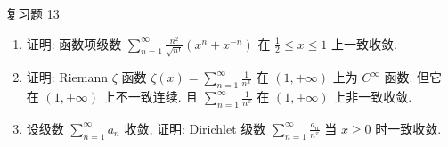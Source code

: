 \begin{exblock}{复习题 13}
\begin{enumerate}
  \item 证明: 函数项级数 $\sum_{n=1}^{\infty}\frac{n^{2}}{\sqrt{n!}}(x^{n}+x^{-n})$ 在 $\frac{1}{2}\leqslant x\leqslant1$ 上一致收敛.
  \item 证明: Riemann $\zeta$ 函数 $\zeta(x)=\sum_{n=1}^{\infty}\frac{1}{n^{x}}$ 在 $(1,+\infty)$ 上为 $C^{\infty}$ 函数. 但它在 $(1,+\infty)$ 上不一致连续. 且 $\sum_{n=1}^{\infty}\frac{1}{n^{x}}$ 在 $(1,+\infty)$ 上非一致收敛.
  \item 设级数 $\sum_{n=1}^{\infty}a_{n}$ 收敛, 证明: Dirichlet 级数 $\sum_{n=1}^{\infty}\frac{a_{n}}{n^{x}}$ 当 $x\geqslant0$ 时一致收敛.
\end{enumerate}
\end{exblock}

